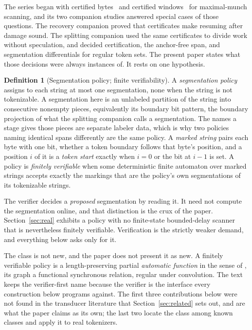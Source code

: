 \documentclass[11pt,a4paper]{article}
\theoremstyle{definition}
\newtheorem{definition}{Definition}
\theoremstyle{plain}
\begin{document}
The series began with certified bytes~\citep{nidhogg2026splitpoints} and certified
windows~\citep{nidhogg2026splitwindows} for maximal-munch scanning, and its two companion studies answered special cases
of those questions. The recovery companion \citep{nidhogg2026panic} proved that certificates make resuming after damage
sound. The splitting companion \citep{nidhogg2026splitting} used the same certificates to divide work without
speculation, and decided certification, the anchor-free span, and segmentation differentials for regular token sets. The
present paper states what those decisions were always instances of. It rests on one hypothesis.

\begin{definition}[Segmentation policy; finite verifiability]\label{def:fv}
A \emph{segmentation policy} assigns to each string at most one segmentation, none when the string is not tokenizable. A
segmentation here is an unlabeled partition of the string into consecutive nonempty pieces, equivalently its boundary
bit pattern, the boundary projection of what the splitting companion calls a segmentation. The names a stage gives those
pieces are separate labeler data, which is why two policies naming identical spans differently are the same policy. A
\emph{marked string} pairs each byte with one bit, whether a token boundary follows that byte's position, and a position
$i$ of it is a \emph{token start} exactly when $i = 0$ or the bit at $i-1$ is set. A policy is
\emph{finitely verifiable} when some deterministic finite automaton over marked strings accepts exactly the markings
that are the policy's own segmentations of its tokenizable strings.
\end{definition}

The verifier decides a \emph{proposed} segmentation by reading it. It need not compute the segmentation online, and that
distinction is the crux of the paper. Section~\ref{sec:real} exhibits a policy with no finite-state bounded-delay
scanner that is nevertheless finitely verifiable. Verification is the strictly weaker demand, and everything below asks
only for it.

The class is not new, and the paper does not present it as new. A finitely verifiable policy is a length-preserving
partial \emph{automatic function} in the sense of \citet{case2013automatic}, its graph a functional synchronous
relation, regular under convolution. The text keeps the verifier-first name because the verifier is the interface every
construction below programs against. The first three contributions below were not found in the transducer literature
that Section~\ref{sec:related} sets out, and are what the paper claims as its own; the last two locate the class among
known classes and apply it to real tokenizers.
\end{document}
